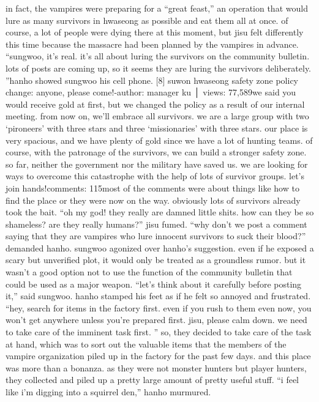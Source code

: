 in fact, the vampires were preparing for a “great feast,” an operation that would lure as many survivors in hwaseong as possible and eat them all at once.
 of course, a lot of people were dying there at this moment, but jisu felt differently this time because the massacre had been planned by the vampires in advance.
“sungwoo, it’s real.
 it’s all about luring the survivors on the community bulletin.
 lots of posts are coming up, so it seems they are luring the survivors deliberately.
”hanho showed sungwoo his cell phone.
[8] suwon hwaseong safety zone policy change: anyone, please come!-author: manager ku │ views: 77,589we said you would receive gold at first, but we changed the policy as a result of our internal meeting.
 from now on, we’ll embrace all survivors.
 we are a large group with two ‘pironeers’ with three stars and three ‘missionaries’ with three stars.
 our place is very spacious, and we have plenty of gold since we have a lot of hunting teams.
 of course, with the patronage of the survivors, we can build a stronger safety zone.
 so far, neither the government nor the military have saved us.
 we are looking for ways to overcome this catastrophe with the help of lots of survivor groups.
 let’s join hands!comments: 115most of the comments were about things like how to find the place or they were now on the way.
obviously lots of survivors already took the bait.
“oh my god! they really are damned little shits.
 how can they be so shameless? are they really humans?” jisu fumed.
“why don’t we post a comment saying that they are vampires who lure innocent survivors to suck their blood?” demanded hanho.
sungwoo agonized over hanho’s suggestion.
 even if he exposed a scary but unverified plot, it would only be treated as a groundless rumor.
 but it wasn’t a good option not to use the function of the community bulletin that could be used as a major weapon.
“let’s think about it carefully before posting it,” said sungwoo.
hanho stamped his feet as if he felt so annoyed and frustrated.
“hey, search for items in the factory first.
 even if you rush to them even now, you won’t get anywhere unless you’re prepared first.
 jisu, please calm down.
 we need to take care of the imminent task first.
”
so, they decided to take care of the task at hand, which was to sort out the valuable items that the members of the vampire organization piled up in the factory for the past few days.
 and this place was more than a bonanza.
 as they were not monster hunters but player hunters, they collected and piled up a pretty large amount of pretty useful stuff.
“i feel like i’m digging into a squirrel den,” hanho murmured.

